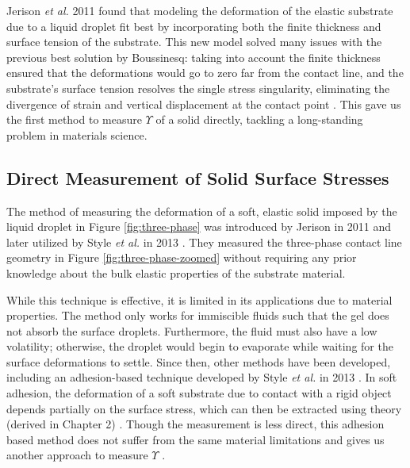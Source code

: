 Jerison \textit{et al.} 2011 \cite{jerison2011deformation} found that modeling the deformation of the elastic substrate due to a liquid droplet fit best by incorporating both the finite thickness and surface tension of the substrate. This new model solved many issues with the previous best solution by Boussinesq: taking into account the finite thickness ensured that the deformations would go to zero far from the contact line, and the substrate's surface tension resolves the single stress singularity, eliminating the divergence of strain and vertical displacement at the contact point \cite{liang2018surface}. This gave us the first method to measure $ \Upsilon $ of a solid directly, tackling a long-standing problem in materials science.


\subsection{Direct Measurement of Solid Surface Stresses}
 The method of measuring the deformation of a soft, elastic solid imposed by the liquid droplet in Figure \ref{fig:three-phase} was introduced by Jerison in 2011 \cite{jerison2011deformation} and later utilized by Style \emph{et al.} in 2013 \cite{style2013universal}. They measured the three-phase contact line geometry in Figure \ref{fig:three-phase-zoomed} without requiring any prior knowledge about the bulk elastic properties of the substrate material. 

While this technique is effective, it is limited in its applications due to material properties. The method only works for immiscible fluids such that the gel does not absorb the surface droplets. Furthermore, the fluid must also have a low volatility; otherwise, the droplet would begin to evaporate while waiting for the surface deformations to settle. Since then, other methods have been developed, including an adhesion-based technique developed by Style \textit{et al.} in 2013 \cite{style2013surface}. In soft adhesion, the deformation of a soft substrate due to contact with a rigid object depends partially on the surface stress, which can then be extracted using theory (derived in Chapter 2) \cite{tian2018measure,CaoZhen2014EAaW,caoAdhesion}. Though the measurement is less direct, this adhesion based method does not suffer from the same material limitations and gives us another approach to measure $ \Upsilon $ \cite{xu2016surface,jensen2015wetting,mondal2015estimation,jagota2012surface,nadermann2013solid,park2014visualization}.

